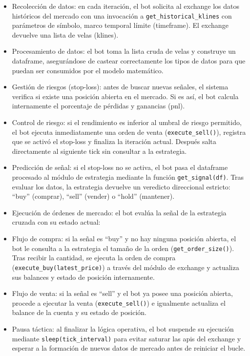 \begin{itemize}
\item  Recolección de datos: en cada iteración, el bot solicita al exchange los datos históricos del mercado con una invocación a \texttt{get\_historical\_klines} con parámetros de símbolo, marco temporal límite (timeframe). El exchange devuelve una lista de velas (klines).

\item  Procesamiento de datos: el bot toma la lista cruda de velas y construye un dataframe, asegurándose de castear correctamente los tipos de datos para que puedan ser consumidos por el modelo matemático.

\item
  Gestión de riesgos (stop-loss): antes de buscar nuevas señales, el sistema verifica si existe una posición abierta en el mercado. Si es así, el bot calcula internamente el porcentaje de pérdidas y ganancias (pnl).

\item Control de riesgo: si el rendimiento es inferior al umbral de riesgo permitido, el bot ejecuta inmediatamente una orden de venta (\texttt{execute\_sell()}), registra que se activó el stop-loss y finaliza la iteración actual. Después salta directamente al siguiente tick sin consultar a la estrategia.

\item  Predicción de señal: si el stop-loss no se activa, el bot pasa el dataframe procesado al módulo de estrategia mediante la función \texttt{get\_signal(df)}. Tras evaluar los datos, la estrategia devuelve un veredicto direccional estricto: ``buy'' (comprar), ``sell'' (vender) o ``hold'' (mantener).

\item  Ejecución de órdenes de mercado: el bot evalúa la señal de la estrategia cruzada con su estado actual:

\item  Flujo de compra: si la señal es ``buy'' y no hay ninguna posición abierta, el bot le consulta a la estrategia el tamaño de la orden (\texttt{get\_order\_size()}). Tras recibir la cantidad, se ejecuta la orden de compra \\(\texttt{execute\_buy(latest\_price)}) a través del módulo de exchange y actualiza sus balances y estado de posición internamente.

\item  Flujo de venta: si la señal es ``sell'' y el bot ya posee una posición abierta, procede a ejecutar la venta (\texttt{execute\_sell()}) e igualmente actualiza el balance de la cuenta y su estado de posición.

\item  Pausa táctica: al finalizar la lógica operativa, el bot suspende su ejecución mediante \texttt{sleep(tick\_interval)} para evitar saturar las apis del exchange y esperar a la formación de nuevos datos de mercado antes de reiniciar el bucle.

\end{itemize}

